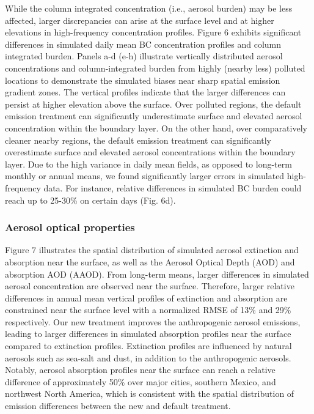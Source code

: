 While the column integrated concentration (i.e., aerosol burden) may be less affected, larger discrepancies can arise at the surface level and at higher elevations in high-frequency concentration profiles. Figure 6 exhibits significant differences in simulated daily mean BC concentration profiles and column integrated burden. Panels a-d (e-h) illustrate vertically distributed aerosol concentrations and column-integrated burden from highly (nearby less) polluted locations to demonstrate the simulated biases near sharp spatial emission gradient zones. The vertical profiles indicate that the larger differences can persist at higher elevation above the surface. Over polluted regions, the default emission treatment can significantly underestimate surface and elevated aerosol concentration within the boundary layer. On the other hand, over comparatively cleaner nearby regions, the default emission treatment can significantly overestimate surface and elevated aerosol concentrations within the boundary layer. Due to the high variance in daily mean fields, as opposed to long-term monthly or annual means, we found significantly larger errors in simulated high-frequency data. For instance, relative differences in simulated BC burden could reach up to 25-30\% on certain days (Fig. 6d).

\subsubsection{Aerosol optical properties}
Figure 7 illustrates the spatial distribution of simulated aerosol extinction and absorption near the surface, as well as the Aerosol Optical Depth (AOD) and absorption AOD (AAOD). From long-term means, larger differences in simulated aerosol concentration are observed near the surface. Therefore, larger relative differences in annual mean vertical profiles of extinction and absorption are constrained near the surface level with a normalized RMSE of 13\% and 29\% respectively. Our new treatment improves the anthropogenic aerosol emissions, leading to larger differences in simulated absorption profiles near the surface compared to extinction profiles. Extinction profiles are influenced by natural aerosols such as sea-salt and dust, in addition to the anthropogenic aerosols.  Notably, aerosol absorption profiles near the surface can reach a relative difference of approximately 50\% over major cities, southern Mexico, and northwest North America, which is consistent with the spatial distribution of emission differences between the new and default treatment.

